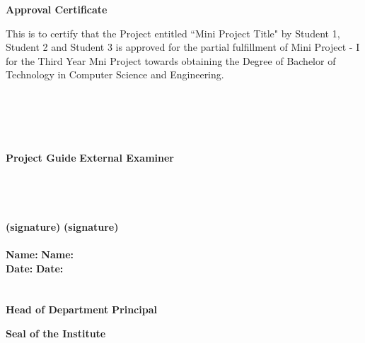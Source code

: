 \newpage
\thispagestyle{empty}
\vspace*{0.2cm}
\vspace{1cm}
\begin{center}
 \large\textbf{Approval Certificate}
\end{center}
\vspace{2cm}
This is to certify that the Project entitled ``Mini Project Title" by Student 1, Student 2 and Student 3 is approved  for the partial fulfillment of Mini Project - I for the Third Year Mni Project towards obtaining the Degree of Bachelor of Technology in Computer Science and Engineering.\\
\\
\\
\\
\\
\\
\textbf{Project Guide} \hspace{3.5in} \textbf{External Examiner}\\ 
\\
\\
\\
\\
\textbf {(signature)} \hspace{3.75in} \textbf{(signature)} \\
\\
\vspace{1cm}
\textbf {Name:} \hspace{4.1in} \textbf{Name:}\\ 
\vspace{1cm}
\textbf {Date:} \hspace{4.2in} \textbf{Date:}\\ 
\vspace{1cm}
\\
\\
\textbf {Head of Department} \hspace{3in} \textbf{Principal}\\ 
\vspace{2cm}
\begin{center}
\textbf{Seal of the Institute}\\
\end{center}

